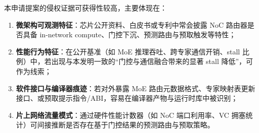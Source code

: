 \documentclass[12pt,a4paper]{article}
\begin{document}
本申请提案的侵权证据可获得性较高，主要体现在：
\begin{enumerate}
    \item \textbf{微架构可观测特征}：芯片公开资料、白皮书或专利中常会披露 NoC 路由器是否具备 in-network compute、门控下沉、预测路由与预取触发等特性；
    \item \textbf{性能行为特征}：在公开基准（如 MoE 推理吞吐、跨专家通信开销、stall 比例）中，若出现与本发明一致的“门控与通信融合带来的显著 stall 降低”，可作为线索；
    \item \textbf{软件接口与编译器痕迹}：若对外暴露 MoE 路由元数据格式、专家映射表更新接口、或预取提示指令/ABI，容易在编译器产物与运行时库中被识别；
    \item \textbf{片上网络流量模式}：通过硬件性能计数器（如 NoC 端口利用率、VC 拥塞统计）可间接推断是否存在基于门控结果的预测路由与预取策略。
    \end{enumerate}
\end{document}

